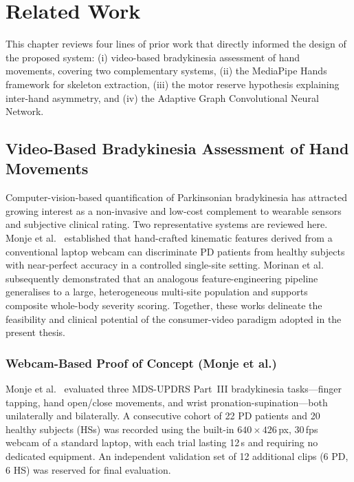 
\chapter{Related Work}
\label{chap:related}

This chapter reviews four lines of prior work that directly informed the design of the proposed system: (i) video-based bradykinesia assessment of hand movements, covering two complementary systems, (ii) the MediaPipe Hands framework for skeleton extraction, (iii) the motor reserve hypothesis explaining inter-hand asymmetry, and (iv) the Adaptive Graph Convolutional Neural Network.

\section{Video-Based Bradykinesia Assessment of Hand Movements}
\label{sec:rw_video_bradykinesia}

Computer-vision-based quantification of Parkinsonian bradykinesia has attracted growing interest as a non-invasive and low-cost complement to wearable sensors and subjective clinical rating. Two representative systems are reviewed here. Monje et al.~\cite{monje2021remote} established that hand-crafted kinematic features derived from a conventional laptop webcam can discriminate PD patients from healthy subjects with near-perfect accuracy in a controlled single-site setting. Morinan et al.~\cite{morinan2023computer} subsequently demonstrated that an analogous feature-engineering pipeline generalises to a large, heterogeneous multi-site population and supports composite whole-body severity scoring. Together, these works delineate the feasibility and clinical potential of the consumer-video paradigm adopted in the present thesis.

\subsection{Webcam-Based Proof of Concept (Monje et al.)}
\label{subsec:rw_monje}

Monje et al.~\cite{monje2021remote} evaluated three MDS-UPDRS Part~III bradykinesia tasks---finger tapping, hand open/close movements, and wrist pronation-supination---both unilaterally and bilaterally. A consecutive cohort of 22 PD patients and 20 healthy subjects (HSs) was recorded using the built-in $640\times426$\,px, 30\,fps webcam of a standard laptop, with each trial lasting 12\,s and requiring no dedicated equipment. An independent validation set of 12 additional clips (6 PD, 6 HS) was reserved for final evaluation.

